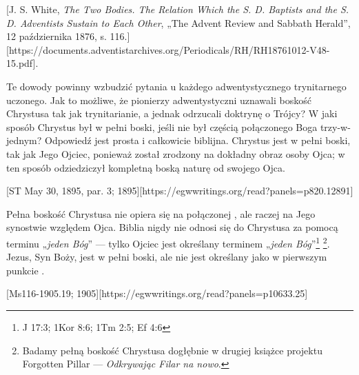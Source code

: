 [J. S. White, \textit{The Two Bodies. The Relation Which the S. D. Baptists and the S. D. Adventists Sustain to Each Other}, „The Advent Review and Sabbath Herald”, 12 października 1876, s. 116.][https://documents.adventistarchives.org/Periodicals/RH/RH18761012-V48-15.pdf].

Te dowody powinny wzbudzić pytania u każdego adwentystycznego trynitarnego uczonego. Jak to możliwe, że pionierzy adwentystyczni uznawali boskość Chrystusa tak jak trynitarianie, a jednak odrzucali doktrynę o Trójcy? W jaki sposób Chrystus był w pełni boski, jeśli nie był częścią połączonego Boga trzy-w-jednym? Odpowiedź jest prosta i całkowicie biblijna. Chrystus jest w pełni boski, tak jak Jego Ojciec, ponieważ został zrodzony na dokładny obraz osoby Ojca; w ten sposób odziedziczył kompletną boską naturę od swojego Ojca.

[ST May 30, 1895, par. 3; 1895][https://egwwritings.org/read?panels=p820.12891]

Pełna boskość Chrystusa nie opiera się na połączonej , ale raczej na Jego synostwie względem Ojca. Biblia nigdy nie odnosi się do Chrystusa za pomocą terminu „\textit{jeden Bóg}” — tylko Ojciec jest określany terminem „\textit{jeden Bóg}”\footnote{J 17:3; 1Kor 8:6; 1Tm 2:5; Ef 4:6} \footnote{Badamy pełną boskość Chrystusa dogłębnie w drugiej książce projektu Forgotten Pillar — \textit{Odkrywając Filar na nowo}.}. Jezus, Syn Boży, jest w pełni boski, ale nie jest określany jako  w pierwszym punkcie .

[Ms116-1905.19; 1905][https://egwwritings.org/read?panels=p10633.25]

